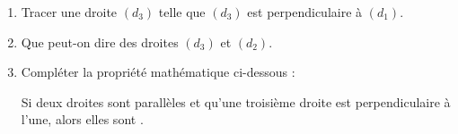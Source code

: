 \documentclass[../main.tex]{subfiles}
\begin{document}
    \begin{center}
    \end{center}\medskip
    \begin{enumerate}[1),font=\bfseries]
        \item Tracer une droite $(d_3)$ telle que $(d_3)$ est perpendiculaire à $(d_1)$.
        \item Que peut-on dire des droites $(d_3)$ et $(d_2)$.
        \dotedline
        \item Compléter la propriété mathématique ci-dessous :
        \begin{simplebox}
            Si deux droites sont parallèles et qu'une troisième droite est
            perpendiculaire à l'une, alors elles sont .
        \end{simplebox}
    \end{enumerate}
\end{document}
